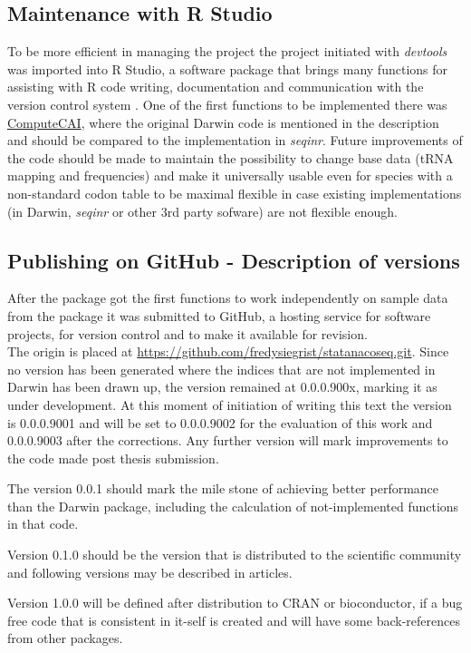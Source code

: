 \subsection{Maintenance with R Studio}
To be more efficient in managing the project the project initiated with \textit{devtools} was imported into R Studio, a software package that brings many functions for assisting with R code writing, documentation and communication with the version control system \cite{Rstudio2015}. One of the first functions to be implemented there was \hyperlink{function:CAI}{ComputeCAI}, where the original Darwin code is mentioned in the description and should be compared to the implementation in \textit{seqinr}. Future improvements of the code should be made to maintain the possibility to change base data (tRNA mapping and frequencies) and make it universally usable even for species with a non-standard codon table to be maximal flexible in case existing implementations (in Darwin, \textit{seqinr} or other 3rd party sofware) are not flexible enough.

\subsection{Publishing on GitHub - Description of versions}
After the package got the first functions to work independently on sample data from the package it was submitted to GitHub, a hosting service for software projects, for version control and to make it available for revision. \\
The origin is placed at \href{https://github.com/fredysiegrist/statanacoseq.git}{https://github.com/fredysiegrist/statanacoseq.git}. Since no version has been generated where the indices that are not implemented in Darwin has been drawn up, the version remained at 0.0.0.900x, marking it as under development. At this moment of initiation of writing this text the version is 0.0.0.9001 and will be set to 0.0.0.9002 for the evaluation of this work and 0.0.0.9003 after the corrections. Any further version will mark improvements to the code made post thesis submission.

The version 0.0.1 should mark the mile stone of achieving better performance than the Darwin package, including the calculation of not-implemented functions in that code.

Version 0.1.0 should be the version that is distributed to the scientific community and following versions may be described in articles.

Version 1.0.0 will be defined after distribution to CRAN or bioconductor, if a bug free code that is consistent in it-self is created and will have some back-references from other packages.